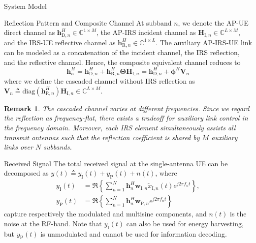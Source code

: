 \documentclass[journal]{IEEEtran}
\newtheorem{remark}{Remark}
\begin{document}
\begin{section}{System Model}
\begin{subsection}{Reflection Pattern and Composite Channel}
			At subband $n$, we denote the AP-UE direct channel as $\boldsymbol{h}_{\mathrm{D},n}^H \in \mathbb{C}^{1 \times M}$, the AP-IRS incident channel as $\boldsymbol{H}_{\mathrm{I},n} \in \mathbb{C}^{L \times M}$, and the IRS-UE reflective channel as $\boldsymbol{h}_{\mathrm{R},n}^H \in \mathbb{C}^{1 \times L}$. The auxiliary AP-IRS-UE link can be modeled as a concatenation of the incident channel, the IRS reflection, and the reflective channel. Hence, the composite equivalent channel reduces to
			\begin{equation}\label{eq:h_n}
				\boldsymbol{h}_{n}^H = \boldsymbol{h}_{\mathrm{D},n}^H + \boldsymbol{h}_{\mathrm{R},n}^H \boldsymbol{\Theta} \boldsymbol{H}_{\mathrm{I},n} = \boldsymbol{h}_{\mathrm{D},n}^H + \boldsymbol{\phi}^H \boldsymbol{V}_{n}
			\end{equation}
			where we define the cascaded channel without IRS reflection as $\boldsymbol{V}_{n} \triangleq \mathrm{diag}(\boldsymbol{h}_{\mathrm{R},n}^H)\boldsymbol{H}_{\mathrm{I},n} \in \mathbb{C}^{L \times M}$.

			\begin{remark}\label{re:subband_tradeoff}
				The cascaded channel varies at different frequencies. Since we regard the reflection as frequency-flat, there exists a tradeoff for auxiliary link control in the frequency domain. Moreover, each IRS element simultaneously assists all transmit antennas such that the reflection coefficient is shared by $M$ auxiliary links over $N$ subbands.
			\end{remark}
		\end{subsection}


		\begin{subsection}{Received Signal}
			The total received signal at the single-antenna UE can be decomposed as $y(t) \triangleq y_{\mathrm{I}}(t)+y_\mathrm{P}(t)+n(t)$, where
			\begin{align}
				y_{\mathrm{I}}(t) & = \Re\left\{\sum_{n=1}^N{\boldsymbol{h}_{n}^H}{\boldsymbol{w}_{\mathrm{I},n}\tilde{x}_{\mathrm{I},n}(t)}{e^{j2{\pi}{f_n}{t}}}\right\},\label{eq:y_I}\\
				y_{\mathrm{P}}(t) & = \Re\left\{\sum_{n=1}^N{\boldsymbol{h}_{n}^H}\boldsymbol{w}_{\mathrm{P},n}{e^{j2{\pi}{f_n}{t}}}\right\}\label{eq:y_P}
			\end{align}
			capture respectively the modulated and multisine components, and $n(t)$ is the noise at the RF-band. Note that $y_{\mathrm{I}}(t)$ can also be used for energy harvesting, but $y_{\mathrm{P}}(t)$ is unmodulated and cannot be used for information decoding.
		\end{subsection}



\end{section}
\end{document}
